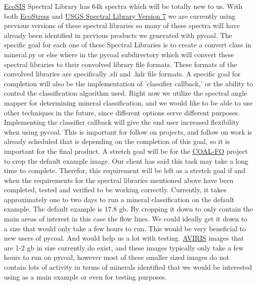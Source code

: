 \documentclass[a4paper,12pt]{article}
\begin{document}
\href{https://ecosis.org/}{EcoSIS} Spectral Library has 64k spectra which will be totally new to us. With both \href{https://speclib.jpl.nasa.gov/}{EcoStress} and \href{https://crustal.usgs.gov/speclab/QueryAll07a.php}{USGS Spectral Library Version 7} we are currently using previous versions of these spectral libraries so many of these spectra will have already been identified in previous products we generated with pycoal. \newline
\newline
The specific goal for each one of these Spectral Libraries is to create a convert class in mineral.py or else where in the pycoal subdirectory which will convert these spectral libraries to their convolved library file formats. These formats of the convolved libraries are specifically .sli and .hdr file formats.\newline
A specific goal for completion will also be the implementation of 'classifier callback,' or the ability to control the classification algorithm used. Right now we utilize the spectral angle mapper for determining mineral classification, and we would like to be able to use other techniques in the future, since different options serve different purposes. Implementing the classifier callback will give the end user increased flexibility when using pycoal. This is important for follow on projects, and follow on work is already scheduled that is depending on the completion of this goal, so it is important for the final product. 
\newline
A stretch goal will be for the \href{https://capstone-coal.github.io/team}{COAL-FO} project to crop the default example image. Our client has said this task may take a long time to complete. Therefor, this requirement will be left as a stretch goal if and when the requirements for the spectral libraries mentioned above have been completed, tested and verified to be working correctly. \newline
\newline
Currently, it takes approximately one to two days to run a mineral classification on the default example. The default example is 17.8 gb. By cropping it down to only contain the main areas of interest in this case the flow lines. We could ideally get it down to a size that would only take a few hours to run. This would be very beneficial to new users of pycoal. And would help us a lot with testing. \href{https://aviris.jpl.nasa.gov/}{AVIRIS} images that are 1-2 gb in size currently do exist, and these images typically only take a few hours to run on pycoal, however most of these smaller sized images do not contain lots of activity in terms of minerals identified that we would be interested using as a main example or even for testing purposes. \newline
\end{document}
